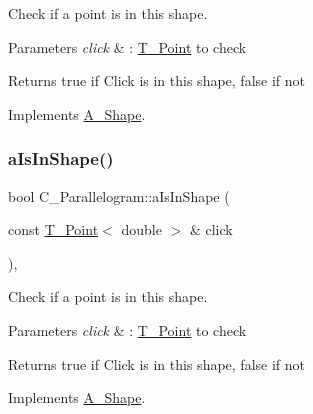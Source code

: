 Check if a point is in this shape. 


\begin{DoxyParams}{Parameters}
{\em click} & \+: \hyperlink{classT__Point}{T\+\_\+\+Point} to check \\
\hline
\end{DoxyParams}
\begin{DoxyReturn}{Returns}
true if Click is in this shape, false if not 
\end{DoxyReturn}


Implements \hyperlink{classA__Shape_a63f825cbc9780208d9a137f5c14917d0}{A\+\_\+\+Shape}.

\mbox{\label{classC__Parallelogram_a9ccee396c30606bfe64df416c22586d5}} 
\subsubsection{\texorpdfstring{a\+Is\+In\+Shape()}{aIsInShape()}\hspace{0.1cm}{\footnotesize\ttfamily [2/2]}}
{\footnotesize\ttfamily bool C\+\_\+\+Parallelogram\+::a\+Is\+In\+Shape (\begin{DoxyParamCaption}\item[{const \hyperlink{classT__Point}{T\+\_\+\+Point}$<$ double $>$ \&}]{click }\end{DoxyParamCaption})\hspace{0.3cm}{\ttfamily [override]}, {\ttfamily [virtual]}}



Check if a point is in this shape. 


\begin{DoxyParams}{Parameters}
{\em click} & \+: \hyperlink{classT__Point}{T\+\_\+\+Point} to check \\
\hline
\end{DoxyParams}
\begin{DoxyReturn}{Returns}
true if Click is in this shape, false if not 
\end{DoxyReturn}


Implements \hyperlink{classA__Shape_a63f825cbc9780208d9a137f5c14917d0}{A\+\_\+\+Shape}.

\mbox{\label{classC__Parallelogram_a260c557810c63dd97f2dd64bc15b9dc8}} 

